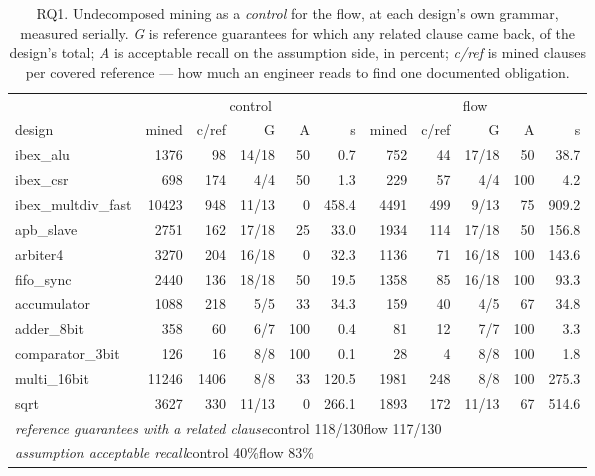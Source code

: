\begin{table}[t]
\centering
\caption{RQ1. Undecomposed mining as a \emph{control} for the flow, at each design's own
grammar, measured serially. \emph{G} is reference guarantees for which any related clause came
back, of the design's total; \emph{A} is acceptable recall on the assumption side, in percent;
\emph{c/ref} is mined clauses per covered reference --- how much an engineer reads to find one
documented obligation.}
\label{tab:rq1}
\begin{tabular}{lrrrrrrrrrr}
\toprule
& \multicolumn{5}{c}{control} & \multicolumn{5}{c}{flow} \\
\cmidrule(lr){2-6}\cmidrule(lr){7-11}
design & mined & c/ref & G & A & s & mined & c/ref & G & A & s \\
\midrule
ibex\_alu & 1376 & 98 & 14/18 & 50 & 0.7 & 752 & 44 & 17/18 & 50 & 38.7 \\
ibex\_csr & 698 & 174 & 4/4 & 50 & 1.3 & 229 & 57 & 4/4 & 100 & 4.2 \\
ibex\_multdiv\_fast & 10423 & 948 & 11/13 & 0 & 458.4 & 4491 & 499 & 9/13 & 75 & 909.2 \\
apb\_slave & 2751 & 162 & 17/18 & 25 & 33.0 & 1934 & 114 & 17/18 & 50 & 156.8 \\
arbiter4 & 3270 & 204 & 16/18 & 0 & 32.3 & 1136 & 71 & 16/18 & 100 & 143.6 \\
fifo\_sync & 2440 & 136 & 18/18 & 50 & 19.5 & 1358 & 85 & 16/18 & 100 & 93.3 \\
accumulator & 1088 & 218 & 5/5 & 33 & 34.3 & 159 & 40 & 4/5 & 67 & 34.8 \\
adder\_8bit & 358 & 60 & 6/7 & 100 & 0.4 & 81 & 12 & 7/7 & 100 & 3.3 \\
comparator\_3bit & 126 & 16 & 8/8 & 100 & 0.1 & 28 & 4 & 8/8 & 100 & 1.8 \\
multi\_16bit & 11246 & 1406 & 8/8 & 33 & 120.5 & 1981 & 248 & 8/8 & 100 & 275.3 \\
sqrt & 3627 & 330 & 11/13 & 0 & 266.1 & 1893 & 172 & 11/13 & 67 & 514.6 \\
\midrule
\multicolumn{11}{l}{\emph{reference guarantees with a related clause}\quad control 118/130\quad flow 117/130} \\
\multicolumn{11}{l}{\emph{assumption acceptable recall}\quad control 40\%\quad flow 83\%} \\
\bottomrule
\end{tabular}
\end{table}

